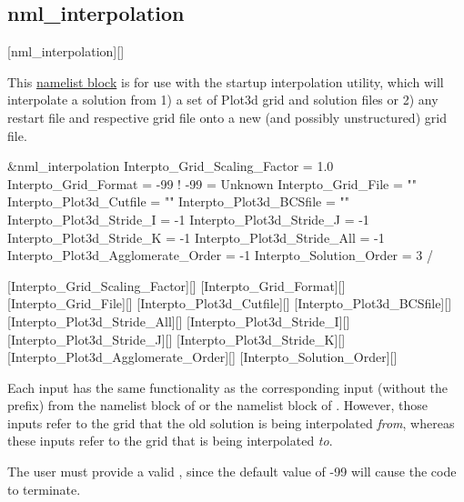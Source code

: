 \subsection{nml\_interpolation}
\label{SEC:nml_interpolation}
\inp*[nmlInterpolation]{}[nml\_interpolation][]

This \hyperref[SEC:User_Input]{namelist block}
is for use with the startup interpolation utility,
which will interpolate a solution from 1) a set of Plot3d grid and solution
files or 2) any restart file and respective grid file onto a new
(and possibly unstructured) grid file.

\begin{nmlblocklst}[
,label={LST:nml_interpolation}
,caption={Namelist nml\_interpolation.}
]
&nml_interpolation
  Interpto_Grid_Scaling_Factor      =   1.0
  Interpto_Grid_Format              = -99   ! -99 = Unknown
  Interpto_Grid_File                =  ""
  Interpto_Plot3d_Cutfile           =  ""
  Interpto_Plot3d_BCSfile           =  ""
  Interpto_Plot3d_Stride_I          =  -1
  Interpto_Plot3d_Stride_J          =  -1
  Interpto_Plot3d_Stride_K          =  -1
  Interpto_Plot3d_Stride_All        =  -1
  Interpto_Plot3d_Agglomerate_Order =  -1
  Interpto_Solution_Order           =   3
/
\end{nmlblocklst}
[Interpto\_Grid\_Scaling\_Factor][]
[Interpto\_Grid\_Format][]
[Interpto\_Grid\_File][]
[Interpto\_Plot3d\_Cutfile][]
[Interpto\_Plot3d\_BCSfile][]
[Interpto\_Plot3d\_Stride\_All][]
[Interpto\_Plot3d\_Stride\_I][]
[Interpto\_Plot3d\_Stride\_J][]
[Interpto\_Plot3d\_Stride\_K][]
[Interpto\_Plot3d\_Agglomerate\_Order][]
[Interpto\_Solution\_Order][]

Each input has the same functionality as the corresponding input
(without the  prefix) from
the  namelist block of  or
the  namelist block of .
%
However, those inputs refer to the grid that
the old solution is being interpolated \emph{from}, whereas
these inputs refer to the grid that is being interpolated \emph{to}.

\NOTE
The user must provide a valid ,
since the default value of -99 will cause the code to terminate.


